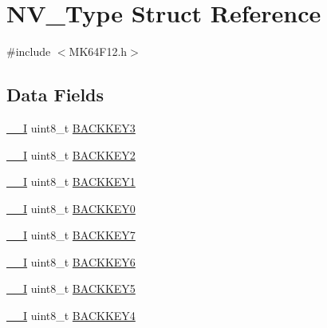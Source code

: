 \hypertarget{struct_n_v___type}{}\section{N\+V\+\_\+\+Type Struct Reference}
\label{struct_n_v___type}


{\ttfamily \#include $<$M\+K64\+F12.\+h$>$}

\subsection*{Data Fields}
\begin{DoxyCompactItemize}
\item 
\mbox{\hyperlink{core__cm4_8h_af63697ed9952cc71e1225efe205f6cd3}{\+\_\+\+\_\+I}} uint8\+\_\+t \mbox{\hyperlink{group___v_r_e_f___peripheral___access___layer_ga7d27c275caa809e8b950cb9fb1f52ea5}{B\+A\+C\+K\+K\+E\+Y3}}
\item 
\mbox{\hyperlink{core__cm4_8h_af63697ed9952cc71e1225efe205f6cd3}{\+\_\+\+\_\+I}} uint8\+\_\+t \mbox{\hyperlink{group___v_r_e_f___peripheral___access___layer_gae0ad5dd66c2109955a90e1a6f4720a43}{B\+A\+C\+K\+K\+E\+Y2}}
\item 
\mbox{\hyperlink{core__cm4_8h_af63697ed9952cc71e1225efe205f6cd3}{\+\_\+\+\_\+I}} uint8\+\_\+t \mbox{\hyperlink{group___v_r_e_f___peripheral___access___layer_ga42fa40dda0fa3aee0b861bdf6ffa1eae}{B\+A\+C\+K\+K\+E\+Y1}}
\item 
\mbox{\hyperlink{core__cm4_8h_af63697ed9952cc71e1225efe205f6cd3}{\+\_\+\+\_\+I}} uint8\+\_\+t \mbox{\hyperlink{group___v_r_e_f___peripheral___access___layer_gaa0da3d6ede3a90b0697a300ddf18cd65}{B\+A\+C\+K\+K\+E\+Y0}}
\item 
\mbox{\hyperlink{core__cm4_8h_af63697ed9952cc71e1225efe205f6cd3}{\+\_\+\+\_\+I}} uint8\+\_\+t \mbox{\hyperlink{group___v_r_e_f___peripheral___access___layer_gae3df2dcb7a5f33570f8cc15cc8126810}{B\+A\+C\+K\+K\+E\+Y7}}
\item 
\mbox{\hyperlink{core__cm4_8h_af63697ed9952cc71e1225efe205f6cd3}{\+\_\+\+\_\+I}} uint8\+\_\+t \mbox{\hyperlink{group___v_r_e_f___peripheral___access___layer_ga3076fe0bf30cde224dfb9c944d517de0}{B\+A\+C\+K\+K\+E\+Y6}}
\item 
\mbox{\hyperlink{core__cm4_8h_af63697ed9952cc71e1225efe205f6cd3}{\+\_\+\+\_\+I}} uint8\+\_\+t \mbox{\hyperlink{group___v_r_e_f___peripheral___access___layer_gaa4ca5b627931a03b02c1d4ac01e664d5}{B\+A\+C\+K\+K\+E\+Y5}}
\item 
\mbox{\hyperlink{core__cm4_8h_af63697ed9952cc71e1225efe205f6cd3}{\+\_\+\+\_\+I}} uint8\+\_\+t \mbox{\hyperlink{group___v_r_e_f___peripheral___access___layer_ga925e5cd64e47102087d0a66af786a626}{B\+A\+C\+K\+K\+E\+Y4}}

\end{DoxyCompactItemize}
